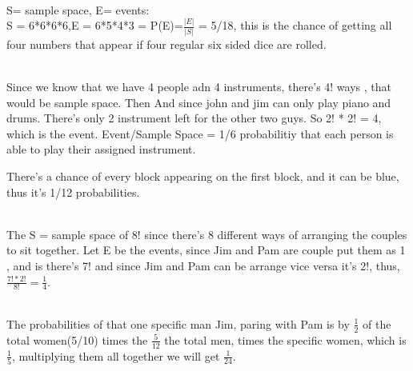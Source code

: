 \documentclass[12pt]{article}
\begin{document}
\begin{enumerate}

\\
S= sample space, E= events:\\
S = 6*6*6*6,E = 6*5*4*3 = \space P(E)=$\frac{|E|}{|S|}$ = 5/18, this is the chance of getting all four numbers that appear if four regular six sided dice are rolled.

\\Since we know that we have 4 people adn 4 instruments, there's 4! ways , that would be sample space. Then And since john and jim can only play piano and drums. There's only 2 instrument left for the other two guys. So 2! * 2! = 4, which is the event. Event/Sample Space = 1/6 probabilitiy that each person is able to play their assigned instrument.


There's a chance of every block appearing on the first block, and it can be blue, thus it's 1/12 probabilities. 

\\
The S = sample space of 8! since there's 8 different ways of arranging the couples to sit together. Let E be the events, since Jim and Pam are couple put them as 1 , and is there's 7! and since Jim and Pam can be arrange vice versa it's 2!, thus, $\frac{7!*2!}{8!} = \frac{1}{4}$. 

\\
The probabilities of that one specific man Jim, paring with Pam is by $\frac{1}{2}$  of the total women(5/10) times the $\frac{5}{12}$ the total men, times the specific women, which is $\frac{1}{5}$, multiplying them all together we will get $\frac{1}{24}$.    


\end{enumerate}
\end{document}
